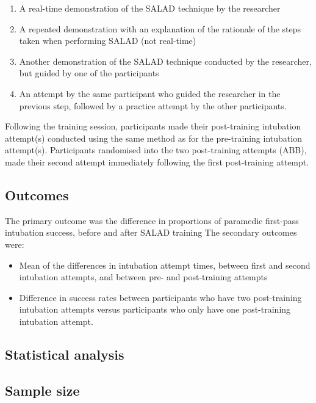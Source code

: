 \documentclass[]{article}
\providecommand{\tightlist}{%
  \setlength{\itemsep}{0pt}\setlength{\parskip}{0pt}}
\begin{document}
\begin{enumerate}
\def\labelenumi{\arabic{enumi}.}
\tightlist
\item
  A real-time demonstration of the SALAD technique by the researcher
\item
  A repeated demonstration with an explanation of the rationale of the
  steps taken when performing SALAD (not real-time)
\item
  Another demonstration of the SALAD technique conducted by the
  researcher, but guided by one of the participants
\item
  An attempt by the same participant who guided the researcher in the
  previous step, followed by a practice attempt by the other
  participants.
\end{enumerate}

Following the training session, participants made their post-training
intubation attempt(s) conducted using the same method as for the
pre-training intubation attempt(s). Participants randomised into the two
post-training attempts (ABB), made their second attempt immediately
following the first post-training attempt.

\hypertarget{outcomes}{%
\subsection{Outcomes}\label{outcomes}}

The primary outcome was the difference in proportions of paramedic
first-pass intubation success, before and after SALAD training The
secondary outcomes were:

\begin{itemize}
\tightlist
\item
  Mean of the differences in intubation attempt times, between first and
  second intubation attempts, and between pre- and post-training
  attempts
\item
  Difference in success rates between participants who have two
  post-training intubation attempts versus participants who only have
  one post-training intubation attempt.
\end{itemize}

\hypertarget{statistical-analysis}{%
\subsection{Statistical analysis}\label{statistical-analysis}}

\hypertarget{sample-size}{%
\subsection{Sample size}\label{sample-size}}
\end{document}
